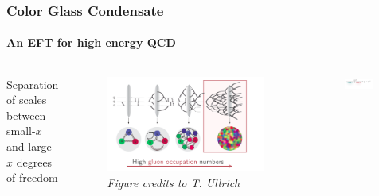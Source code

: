 \documentclass[aspectratio=169,11pt,usenames,dvipsnames]{beamer}
\begin{document}
\begin{frame}[noframenumbering]
    \frametitle{Color Glass Condensate}
    \framesubtitle{An EFT for high energy QCD}
    \vspace{-10pt}
    \begin{columns}[onlytextwidth,t]
            \begin{center}
                {\footnotesize Separation of scales between\\
                {\color{customgreen}small-{\tiny $x$}} and {\color{custompink}large-{\huge $x$}} degrees of freedom}
            \end{center}
            \vspace{-10pt}
            \begin{figure}[!hbt]
                \centering
                \includegraphics[width=\textwidth]{images/qcd_2.png}
                \captionsetup{justification=centering}
                \vspace{-20pt}
                \caption{\tiny\itshape Figure credits to T. Ullrich}
            \end{figure}
        \begin{center}
            \begin{figure}[!hbt]
                \centering
                \includegraphics[width=0.9\textwidth]{images/small_large_x.png}

\end{figure}
\end{center}
\end{columns}
\end{frame}
\end{document}
